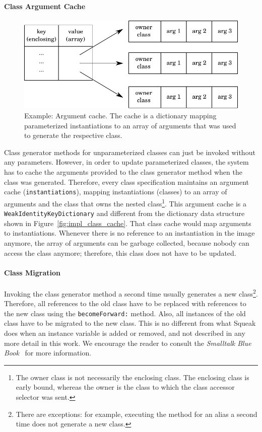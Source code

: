 \paragraph{Class Argument Cache}
\label{sec:impl_cls_arg_cache_subsec}
\begin{figure}[!htp]
	\centering
	\includegraphics[scale=0.7]{arg_cache.pdf}
	\caption[Example: Argument cache]{Example: Argument cache. The cache is a dictionary mapping parameterized instantiations to an array of arguments that was used to generate the respective class.}
	\label{fig:impl_arg_cache}
\end{figure}

Class generator methods for unparameterized classes can just be invoked without any parameters. However, in order to update parameterized classes, the system has to cache the arguments provided to the class generator method when the class was generated. Therefore, every class specification maintains an argument cache (\texttt{instantiations}), mapping instantiations (classes) to an array of arguments and the class that owns the nested class\footnote{The owner class is not necessarily the enclosing class. The enclosing class is early bound, whereas the owner is the class to which the class accessor selector was sent.}. This argument cache is a \texttt{WeakIdentityKeyDictionary} and different from the dictionary data structure shown in Figure~\ref{fig:impl_class_cache}. That class cache would map arguments to instantiations. Whenever there is no reference to an instantiation in the image anymore, the array of arguments can be garbage collected, because nobody can access the class anymore; therefore, this class does not have to be updated.

\paragraph{Class Migration}
Invoking the class generator method a second time usually generates a new class\footnote{There are exceptions: for example, executing the method for an alias a second time does not generate a new class.}. Therefore, all references to the old class have to be replaced with references to the new class using the \texttt{becomeForward:} method. Also, all instances of the old class have to be migrated to the new class. This is no different from what Squeak does when an instance variable is added or removed, and not described in any more detail in this work. We encourage the reader to consult the \emph{Smalltalk Blue Book}~\cite{Goldberg:1983:SLI:273} for more information.

